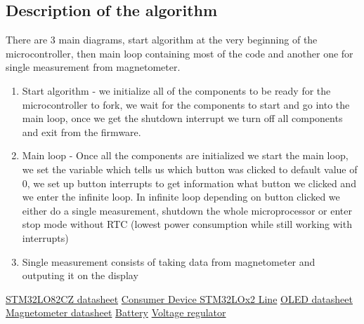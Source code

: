 \documentclass{article}
\begin{document}
\subsection{Description of the algorithm}
There are 3 main diagrams, start algorithm at the very beginning of the
microcontroller, then main loop containing most of the code and another one for
single measurement from magnetometer.
\begin{enumerate}
	\item Start algorithm - we initialize all of the components to be ready
		for the microcontroller to fork, we wait for the components to
		start and go into the main loop, once we get the shutdown
		interrupt we turn off all components and exit from the firmware.
	\item Main loop - Once all the components are initialized we start the
		main loop, we set the variable which tells us which button was
		clicked to default value of 0, we set up button interrupts to
		get information what button we clicked and we enter the infinite
		loop. In infinite loop depending on button clicked we either do
		a single measurement, shutdown the whole microprocessor or enter
		stop mode without RTC (lowest power consumption while still
		working with interrupts)
	\item Single measurement consists of taking data from magnetometer and
		outputing it on the display
\end{enumerate}
\begin{thebibliography}{9}
	\href{https://www.st.com/resource/en/datasheet/stm32l082cz.pdf}{STM32LO82CZ
	datasheet}
	\href{https://www.st.com/en/microcontrollers-microprocessors/stm32l0-series.html}{Consumer
	Device STM32LOx2 Line}
	\href{https://www.mouser.pl/datasheet/2/291/NHD_2_7_12864WDY3-1116258.pdf}{OLED
	datasheet}
	\href{https://cdn-shop.adafruit.com/datasheets/HMC5883L_3-Axis_Digital_Compass_IC.pdf}{Magnetometer
	datasheet}
	\href{https://www.murata.com/products/productdata/8809693839390/LR44R-DATASHEET.pdf?1604287808000}{Battery}
	\href{https://www.analog.com/media/en/technical-documentation/data-sheets/3525fc.pdf}{Voltage
	regulator} 
\end{thebibliography}
\end{document}
